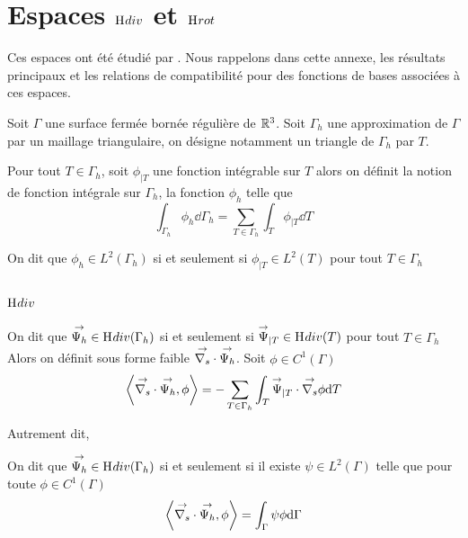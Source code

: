 \section[Espaces Hdiv et Hrot]{Espaces \(\mathrm{H}_\mathrm{{}}{div}\) et \(\mathrm{H}_\mathrm{{}}{rot}\)}

Ces espaces ont été étudié par \cite{nedelec_mixed_1980}. Nous rappelons dans cette annexe, les résultats principaux et les relations de compatibilité pour des fonctions de bases associées à ces espaces.

Soit \(\Gamma\) une surface fermée bornée régulière de \(\mathbb R^3\).
Soit \(\Gamma_h\) une approximation de \(\Gamma\) par un maillage triangulaire, on désigne notamment un triangle de \(\Gamma_h\) par \(T\).

\begin{defn}
    Pour tout \(T \in \Gamma_h\), soit \(\phi_{|T}\) une fonction intégrable sur \(T\) alors
    on définit la notion de fonction intégrale sur \(\Gamma_h\), la fonction \(\phi_h\) telle que
    \begin{equation}
        \int_{\Gamma_h} \phi_h \dd{\Gamma_h} = \sum_{T\in\Gamma_h} \int_T \phi_{|T} \dd{T}
    \end{equation}
\end{defn}

\begin{defn}
    On dit que \(\phi_h \in L^2(\Gamma_h)\) si et seulement si \(\phi_{|T} \in L^2(T)\) pour tout \(T \in \Gamma_h\)
\end{defn}

\subsection[Hdiv]{\(\mathrm{H}_\mathrm{{}}{div}\)}

\begin{defn}
    On dit que \({\overset{\rightarrow}{\Psi_h}} \in \mathrm{H}_\mathrm{{}}{div}(\Gamma_h)\) si et seulement si \({\overset{\rightarrow}{\Psi}}_{|T} \in \mathrm{H}_\mathrm{{}}{div}(T)\) pour tout \(T \in \Gamma_h\)
    Alors on définit sous forme faible \({\overset{\rightarrow}{\nabla_s}} \cdot {\overset{\rightarrow}{\Psi_h}} \).
    Soit \(\phi \in C^1(\Gamma)\)
    \begin{equation}
        \left< \vdivs \vect{\Psi_h}, \phi \right> %
        = - \sum_{T\in\Gamma_h} \int_T \vect{\Psi}_{|T} \cdot \vgrads \phi\dd{T}
    \end{equation}
\end{defn}

Autrement dit, \cite[eq.~5.3]{bendali_equations_2014}
\begin{defn}
    On dit que \({\overset{\rightarrow}{\Psi_h}} \in \mathrm{H}_\mathrm{{}}{div}(\Gamma_h)\) si et seulement si il existe \(\psi\in L^2(\Gamma)\) telle que pour toute \(\phi \in C^1(\Gamma)\)
    \begin{equation}
        \left< {\overset{\rightarrow}{\nabla_s}} \cdot {\overset{\rightarrow}{\Psi_h}}, \phi \right> = \int_\Gamma \psi \phi \mathrm{d}{\Gamma}
    \end{equation}
\end{defn}

